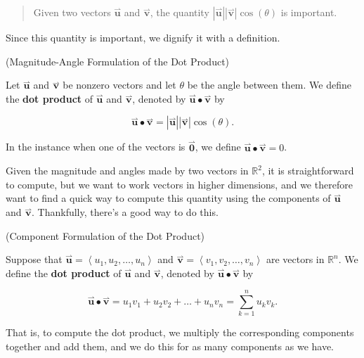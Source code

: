 \documentclass{ximera}
\begin{document}
\begin{quote}
Given two vectors $\overset{\boldsymbol{\rightharpoonup}}{\mathbf{u}}$ and $\overset{\boldsymbol{\rightharpoonup}}{\mathbf{v}}$, the quantity $|\overset{\boldsymbol{\rightharpoonup}}{\mathbf{u}}||\overset{\boldsymbol{\rightharpoonup}}{\mathbf{v}}|\cos(\theta)$ is important.
\end{quote}

Since this quantity is important, we dignify it with a definition.

\begin{definition} (Magnitude-Angle Formulation of the Dot Product)

Let $\overset{\boldsymbol{\rightharpoonup}}{\mathbf{u}}$ and $\overset{\boldsymbol{\rightharpoonup}}{\mathbf{v}}$ be nonzero vectors and let $\theta$ be the angle between them.  We define the \textbf{dot product} of $\overset{\boldsymbol{\rightharpoonup}}{\mathbf{u}}$ and $\overset{\boldsymbol{\rightharpoonup}}{\mathbf{v}}$, denoted by $\overset{\boldsymbol{\rightharpoonup}}{\mathbf{u}} \bullet \overset{\boldsymbol{\rightharpoonup}}{\mathbf{v}}$ by

\[
\overset{\boldsymbol{\rightharpoonup}}{\mathbf{u}} \bullet \overset{\boldsymbol{\rightharpoonup}}{\mathbf{v}} = |\overset{\boldsymbol{\rightharpoonup}}{\mathbf{u}}||\overset{\boldsymbol{\rightharpoonup}}{\mathbf{v}}|\cos(\theta).
\]

In the instance when one of the vectors is $\overset{\boldsymbol{\rightharpoonup}}{\mathbf{0}}$, we define $\overset{\boldsymbol{\rightharpoonup}}{\mathbf{u}} \bullet \overset{\boldsymbol{\rightharpoonup}}{\mathbf{v}} = 0$.
\end{definition}




Given the magnitude and angles made by two vectors in $\mathbb{R}^2$, it is straightforward to compute, but we want to work vectors in higher dimensions, and we therefore want to find a quick way to compute this quantity using the components of $\overset{\boldsymbol{\rightharpoonup}}{\mathbf{u}}$ and $\overset{\boldsymbol{\rightharpoonup}}{\mathbf{v}}$.  Thankfully, there's a good way to do this.

\begin{theorem} (Component Formulation of the Dot Product)

Suppose that $\overset{\boldsymbol{\rightharpoonup}}{\mathbf{u}} = \left< u_1,u_2,\ldots,u_n \right>$ and $\overset{\boldsymbol{\rightharpoonup}}{\mathbf{v}} = \left< v_1,v_2,\ldots,v_n \right>$ are vectors in $\mathbb{R}^n$.  We define the \textbf{dot product} of $\overset{\boldsymbol{\rightharpoonup}}{\mathbf{u}}$ and $\overset{\boldsymbol{\rightharpoonup}}{\mathbf{v}}$, denoted by $\overset{\boldsymbol{\rightharpoonup}}{\mathbf{u}} \bullet \overset{\boldsymbol{\rightharpoonup}}{\mathbf{v}}$ by

\[
\overset{\boldsymbol{\rightharpoonup}}{\mathbf{u}} \bullet \overset{\boldsymbol{\rightharpoonup}}{\mathbf{v}} = u_1v_1 +u_2v_2+ \ldots + u_nv_n = \sum_{k=1}^n u_kv_k.
\]

That is, to compute the dot product, we multiply the corresponding components together and add them, and we do this for as many components as we have.
\end{theorem}
\end{document}
